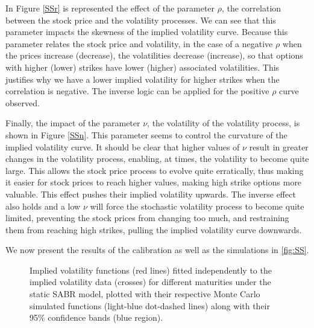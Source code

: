 In Figure \autoref{SSr} is represented the effect of the parameter $\rho$, the correlation between the stock price and the volatility processes.
We can see that this parameter impacts the skewness of the implied volatility curve. Because this parameter relates the stock price and volatility, in the case of a negative $\rho$ when the prices increase (decrease), the volatilities decrease (increase), so that options with higher (lower) strikes have lower (higher) associated volatilities. This justifies why we have a lower implied volatility for higher strikes when the correlation is negative. The inverse logic can be applied for the positive $\rho$ curve observed.

Finally, the impact of the parameter $\nu$, the volatility of the volatility process, is shown in Figure \autoref{SSn}. This parameter seems to control the curvature of the implied volatility curve. It should be clear that higher values of $\nu$ result in greater changes in the volatility process, enabling, at times, the volatility to become quite large. This allows the stock price process to evolve quite erratically, thus making it easier for stock prices to reach higher values, making high strike options more valuable. This effect pushes their implied volatility upwards. The inverse effect also holds and a low $\nu$ will force the stochastic volatility process to become quite limited, preventing the stock prices from changing too much, and restraining them from reaching high strikes, pulling the implied volatility curve downwards.


We now present the results of the calibration as well as the simulations in \autoref{fig:SS}.

\vspace{\fill}
\newpage

\begin{figure}[H]
  \begin{subfigmatrix}{2}
  \end{subfigmatrix}
  \caption[Implied volatility functions fitted independently to the implied volatility data for different maturities under the static SABR model, plotted with their respective Monte Carlo simulated functions along with their 95\% confidence bands.]{Implied volatility functions (red lines) fitted independently to the implied volatility data (crosses) for different maturities under the static SABR model, plotted with their respective Monte Carlo simulated functions (light-blue dot-dashed lines) along with their 95\% confidence bands (blue region).}
  \label{fig:SS}
\end{figure}

